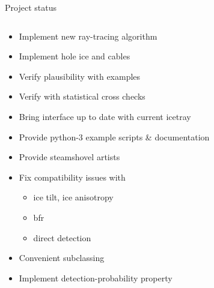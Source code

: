 
\begin{frame}[fragile]{Project status}

  \begin{columns}
    \begin{column}{0.5\textwidth}
      \begin{overlayarea}{\textwidth}{\textheight}
        \small
        \begin{itemize}
          \setlength\itemsep{0.2em}
          \item<alert@1>[\done] Implement new ray-tracing algorithm
          \item<alert@2>[\done] Implement hole ice and cables
          \item<alert@3>[\done] Verify plausibility with examples
          \item<alert@4>[\done] Verify with statistical cross checks
          \item<alert@5>[\done] Bring interface up to date with current icetray %
          \item<alert@6>[\done] Provide python-3 example scripts \& documentation
          \item<alert@7>[\done] Provide steamshovel artists
          \item<alert@8>[\inprogress] Fix compatibility issues with
          \begin{itemize}
            \item[\tobedone] ice tilt, ice anisotropy
            \item[\tobedone] bfr
            \item[\tobedone] direct detection
          \end{itemize}
          \item<alert@9>[\tobedone] Convenient subclassing
          \item<alert@10>[\tobedone] Implement detection-probability property
        \end{itemize}
      \end{overlayarea}
    \end{column}
    \begin{column}{0.5\textwidth}%
\end{column}
\end{columns}
\end{frame}

